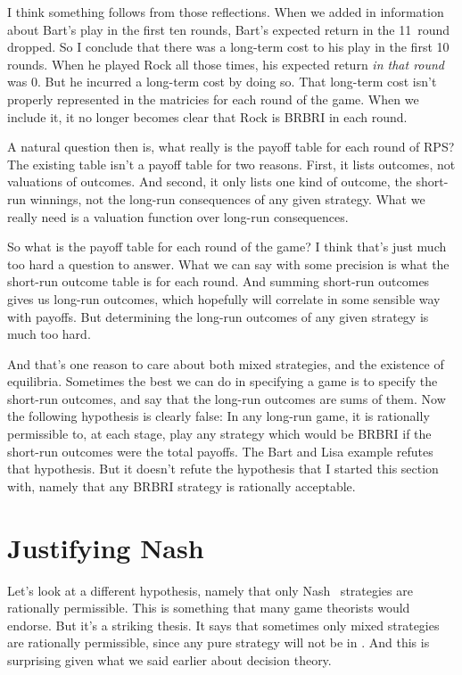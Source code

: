 I think something follows from those reflections. When we added in information about Bart's play in the first ten rounds, Bart's expected return in the 11\sth\ round dropped. So I conclude that there was a long-term cost to his play in the first 10 rounds. When he played Rock all those times, his expected return \textit{in that round} was 0. But he incurred a long-term cost by doing so. That long-term cost isn't properly represented in the matricies for each round of the game. When we include it, it no longer becomes clear that Rock is BRBRI in each round.

A natural question then is, what really is the payoff table for each round of RPS? The existing table isn't a payoff table for two reasons. First, it lists outcomes, not valuations of outcomes. And second, it only lists one kind of outcome, the short-run winnings, not the long-run consequences of any given strategy. What we really need is a valuation function over long-run consequences. 

So what is the payoff table for each round of the game? I think that's just much too hard a question to answer. What we can say with some precision is what the short-run outcome table is for each round. And summing short-run outcomes gives us long-run outcomes, which hopefully will correlate in some sensible way with payoffs. But determining the long-run outcomes of any given strategy is much too hard.

And that's one reason to care about both mixed strategies, and the existence of equilibria. Sometimes the best we can do in specifying a game is to specify the short-run outcomes, and say that the long-run outcomes are sums of them. Now the following hypothesis is clearly false: In any long-run game, it is rationally permissible to, at each stage, play any strategy which would be BRBRI if the short-run outcomes were the total payoffs. The Bart and Lisa example refutes that hypothesis. But it doesn't refute the hypothesis that I started this section with, namely that any BRBRI strategy is rationally acceptable.

\section{Justifying Nash}

Let's look at a different hypothesis, namely that only Nash \Eqm\ strategies are rationally permissible. This is something that many game theorists would endorse. But it's a striking thesis. It says that sometimes only mixed strategies are rationally permissible, since any pure strategy will not be in \eqm. And this is surprising given what we said earlier about decision theory.

